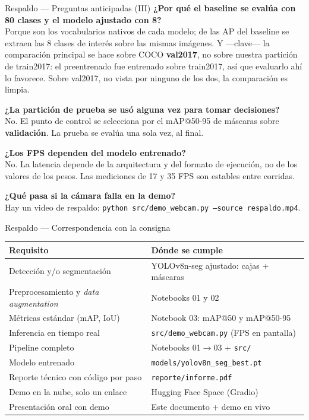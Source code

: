 \documentclass[aspectratio=169,11pt]{beamer}
\begin{document}
\begin{frame}{Respaldo --- Preguntas anticipadas (III)}
  \small
  \textbf{¿Por qué el baseline se evalúa con 80 clases y el modelo ajustado con 8?}\\
  Porque son los vocabularios nativos de cada modelo; de las AP del baseline se extraen las
  8 clases de interés sobre las mismas imágenes. Y ---clave--- la comparación principal se
  hace sobre COCO \textbf{val2017}, no sobre nuestra partición de train2017: el preentrenado
  fue entrenado sobre train2017, así que evaluarlo ahí lo favorece. Sobre val2017, no vista
  por ninguno de los dos, la comparación es limpia.
  \vspace{0.6em}

  \textbf{¿La partición de prueba se usó alguna vez para tomar decisiones?}\\
  No. El punto de control se selecciona por el mAP@50-95 de máscaras sobre
  \textbf{validación}. La prueba se evalúa una sola vez, al final.
  \vspace{0.6em}

  \textbf{¿Los FPS dependen del modelo entrenado?}\\
  No. La latencia depende de la arquitectura y del formato de ejecución, no de los valores
  de los pesos. Las mediciones de 17 y 35 FPS son estables entre corridas.
  \vspace{0.6em}

  \textbf{¿Qué pasa si la cámara falla en la demo?}\\
  Hay un video de respaldo: \texttt{python src/demo\_webcam.py --source respaldo.mp4}.
\end{frame}

\begin{frame}{Respaldo --- Correspondencia con la consigna}
  \centering
  \small
  \begin{tabular}{@{}ll@{}}
    \toprule
    \textbf{Requisito} & \textbf{Dónde se cumple} \\
    \midrule
    Detección y/o segmentación & YOLOv8n-seg ajustado: cajas + máscaras \\
    Preprocesamiento y \emph{data augmentation} & Notebooks 01 y 02 \\
    Métricas estándar (mAP, IoU) & Notebook 03: mAP@50 y mAP@50-95 \\
    Inferencia en tiempo real & \texttt{src/demo\_webcam.py} (FPS en pantalla) \\
    Pipeline completo & Notebooks 01$\rightarrow$03 + \texttt{src/} \\
    Modelo entrenado & \texttt{models/yolov8n\_seg\_best.pt} \\
    Reporte técnico con código por paso & \texttt{reporte/informe.pdf} \\
    Demo en la nube, solo un enlace & Hugging Face Space (Gradio) \\
    Presentación oral con demo & Este documento + demo en vivo \\
    \bottomrule
  \end{tabular}
\end{frame}
\end{document}
